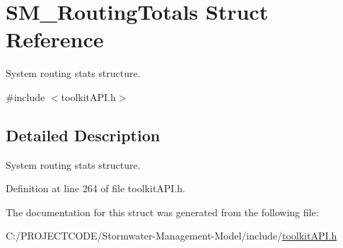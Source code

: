 \hypertarget{struct_s_m___routing_totals}{}\section{S\+M\+\_\+\+Routing\+Totals Struct Reference}
\label{struct_s_m___routing_totals}


System routing stats structure.  




{\ttfamily \#include $<$toolkit\+A\+P\+I.\+h$>$}



\subsection{Detailed Description}
System routing stats structure. 

Definition at line 264 of file toolkit\+A\+P\+I.\+h.



The documentation for this struct was generated from the following file\+:\begin{DoxyCompactItemize}
\item 
C\+:/\+P\+R\+O\+J\+E\+C\+T\+C\+O\+D\+E/\+Stormwater-\/\+Management-\/\+Model/include/\hyperlink{toolkit_a_p_i_8h}{toolkit\+A\+P\+I.\+h}\end{DoxyCompactItemize}
